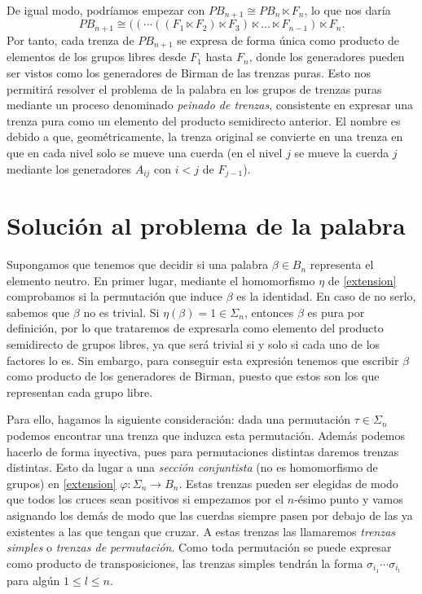 \documentclass[TFG.tex]{subfiles}
\begin{document}
De igual modo, podríamos empezar con $PB_{n+1}\cong PB_n\ltimes F_n$, lo que nos daría
$$PB_{n+1}\cong ((\cdots ((F_1\ltimes F_2)\ltimes F_3)\ltimes\dots\ltimes F_{n-1})\ltimes F_n.$$
Por tanto, cada trenza de $PB_{n+1}$ se expresa de forma única como producto de elementos de los grupos libres desde $F_1$ hasta $F_n$, donde los generadores pueden ser vistos como los generadores de Birman de las trenzas puras. Esto nos permitirá resolver el problema de la palabra en los grupos de trenzas puras mediante un proceso denominado \emph{peinado de trenzas}, consistente en expresar una trenza pura como un elemento del producto semidirecto anterior. El nombre es debido a que, geométricamente, la trenza original se convierte en una trenza en que en cada nivel solo se mueve una cuerda (en el nivel $j$ se mueve la cuerda $j$ mediante los generadores $A_{ij}$ con $i<j$ de $F_{j-1}$).


\section{Solución al problema de la palabra}





Supongamos que tenemos que decidir si una palabra $\beta\in B_n$ representa el elemento neutro. En primer lugar, mediante el homomorfismo $\eta$ de \ref{extension} comprobamos si la permutación que induce $\beta$ es la identidad. En caso de no serlo, sabemos que $\beta$ no es trivial. Si $\eta(\beta)=1\in\Sigma_n$, entonces $\beta$ es pura por definición, por lo que trataremos de expresarla como elemento del producto semidirecto de grupos libres, ya que será trivial si y solo si cada uno de los factores lo es. Sin embargo, para conseguir esta expresión tenemos que escribir $\beta$ como producto de los generadores de Birman, puesto que estos son los que representan cada grupo libre.

Para ello, hagamos la siguiente consideración: dada una permutación $\tau\in\Sigma_n$ podemos encontrar una trenza que induzca esta permutación. Además podemos hacerlo de forma inyectiva, pues para permutaciones distintas daremos trenzas distintas. Esto da lugar a una \emph{sección conjuntista} (no es homomorfismo de grupos) en \ref{extension} $\varphi:\Sigma_n\to B_n$. Estas trenzas pueden ser elegidas de modo que todos los cruces sean positivos si empezamos por el $n$-ésimo punto y vamos asignando los demás de modo que las cuerdas siempre pasen por debajo de las ya existentes a las que tengan que cruzar. A estas trenzas las llamaremos \emph{trenzas simples} o \emph{trenzas de permutación}. Como toda permutación se puede expresar como producto de transposiciones, las trenzas simples tendrán la forma $\sigma_{i_1}\cdots\sigma_{i_l}$ para algún $1\leq l\leq n$. 
\end{document}
